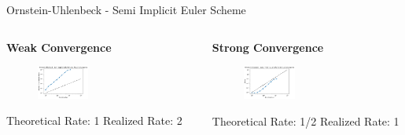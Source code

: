 \documentclass[]{beamer}
\begin{document}
\begin{frame}{Ornstein-Uhlenbeck - Semi Implicit Euler Scheme}
  \begin{columns}
    \begin{column}{0.475\textwidth}
    \begin{center}
      \textbf{Weak Convergence}
    \end{center}
    \begin{figure}[t]
    \vspace{-1pt}
    \captionsetup[figure]{labelformat=empty}
    \includegraphics[width=0.4\textwidth]{ou_weak_semi.png}
    \end{figure}
    Theoretical Rate: 1
    \newline
    Realized Rate: 2
    \end{column}

    \begin{column}{0.475\textwidth}
    \begin{center}
      \textbf{Strong Convergence}
    \end{center}
    \begin{figure}[t]
    \vspace{-1pt}
    \captionsetup[figure]{labelformat=empty}
    \includegraphics[width=0.4\textwidth]{ou_strong_semi.png}
    \end{figure}
    Theoretical Rate: 1/2
    \newline
    Realized Rate: 1
    \end{column}
  \end{columns}
\end{frame}
\end{document}
